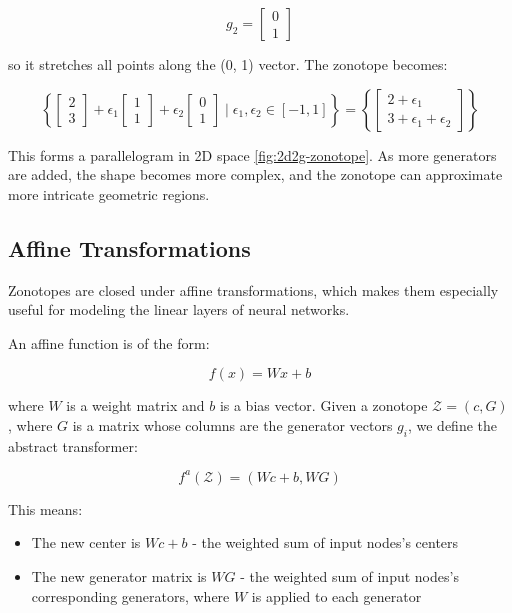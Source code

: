 \documentclass[oneside,11pt,dvipsnames]{book}
\numberwithin{equation}{section}
\theoremstyle{definition}
\theoremstyle{remark}
\begin{document}
\[
g_2 = \begin{bmatrix}0 \\ 1\end{bmatrix} 
\]

so it stretches all points along the (0, 1) vector.
The zonotope becomes:

\[
\left\{
\begin{bmatrix}2 \\ 3\end{bmatrix} + \epsilon_1 \begin{bmatrix}1 \\ 1\end{bmatrix} + \epsilon_2 \begin{bmatrix}0 \\ 1\end{bmatrix}
\mid \epsilon_1, \epsilon_2 \in [-1, 1]
\right\}
= \left\{
\begin{bmatrix}2 + \epsilon_1 \\ 3 + \epsilon_1 + \epsilon_2\end{bmatrix}
\right\}
\]


This forms a parallelogram in 2D space \ref{fig:2d2g-zonotope}. As more generators are added, the shape becomes more complex, and the zonotope can approximate more intricate geometric regions.

\subsection{Affine Transformations}

Zonotopes are closed under affine transformations, which makes them especially useful for modeling the linear layers of neural networks.

An affine function is of the form:

\[
f(x) = W x + b
\]

where \(W\) is a weight matrix and \(b\) is a bias vector. Given a zonotope \(\mathcal{Z} = (c, G)\), where \(G\) is a matrix whose columns are the generator vectors \(g_i\), we define the abstract transformer:

\[
f^a(\mathcal{Z}) = (Wc + b, WG)
\]

This means:
\begin{itemize}
    \item The new center is \(Wc + b\) - the weighted sum of input nodes's centers
    \item The new generator matrix is \(WG\) - the weighted sum of input nodes's corresponding generators, where \(W\) is applied to each generator 
\end{itemize}
\end{document}
